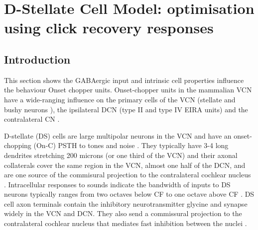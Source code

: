 
\graphicspath{{/media/data/Work/cnstellate/DS_ClickRecovery/}{/media/data/Work/Responses/}{../figures/}{./gfx/}}
\section[DS Cell Model]{D-Stellate Cell Model: optimisation using click recovery responses}
\label{sec:d-stellate-cell-model}

\subsection{Introduction}

This section shows the GABAergic input and intrinsic cell properties
influence the behaviour Onset chopper units.  Onset-chopper units in
the mammalian VCN have a wide-ranging influence on the primary cells
of the VCN (stellate and bushy neurons \citep{RhodeSmithEtAl:1983}),
the ipsilateral DCN (type II and type IV EIRA units) and the
contra\-lateral CN \citep{NeedhamPaolini:2007}.

\medskip{}


  
D-stellate (DS) cells are large multipolar neurons in the VCN and have an
onset-chopping (On-C) PSTH to tones and noise \citep{SmithRhode:1989,
  NeedhamPaolini:2006}.  They typically have 3-4 long dendrites stretching 200
microns (or one third of the VCN) and their axonal collaterals cover the same
region in the VCN, almost one half of the DCN, and are one source of the
commisural projection to the contralateral cochlear nucleus
\citep{Cant:1992,Cant:1981,SchofieldCant:1996,CantBenson:2003,
  NeedhamPaolini:2007, PaoliniClark:1999}. Intracellular responses to sounds
indicate the bandwidth of inputs to DS neurons typically ranges from two octaves
below CF to one octave above CF \citep{PalmerJiangEtAl:1996,
  JiangPalmerEtAl:1996, PaoliniClark:1999}. DS cell axon terminals contain the
inhibitory neurotransmitter glycine and synapse widely in the VCN and DCN\@.
They also send a commissural projection to the contralateral cochlear nucleus
that mediates fast inhibition between the nuclei \citep{NeedhamPaolini:2003,
  NeedhamPaolini:2006, Oertel:1997}.


